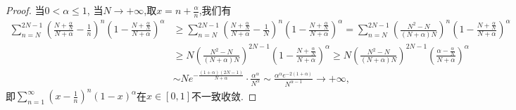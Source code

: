 \documentclass[../../main.tex]{subfiles}
\begin{document}
\begin{proof}
当$0<\alpha\leqslant1$, 当$N\to+\infty$,取$x=n+\frac{\alpha}{n}$,我们有
$$
\begin{aligned}
\sum_{n=N}^{2N-1}{\left( \frac{N+\frac{\alpha}{N}}{N+\alpha}-\frac{1}{n} \right) ^n\left( 1-\frac{N+\frac{\alpha}{N}}{N+\alpha} \right) ^{\alpha}}&\geqslant \sum_{n=N}^{2N-1}{\left( \frac{N+\frac{\alpha}{N}}{N+\alpha}-\frac{1}{N} \right) ^n\left( 1-\frac{N+\frac{\alpha}{N}}{N+\alpha} \right) ^{\alpha}}
=\sum_{n=N}^{2N-1}{\left( \frac{N^2-N}{(N+\alpha )N} \right) ^n\left( 1-\frac{N+\frac{\alpha}{N}}{N+\alpha} \right) ^{\alpha}}
\\
&\geqslant N\left( \frac{N^2-N}{(N+\alpha )N} \right) ^{2N-1}\left( 1-\frac{N+\frac{\alpha}{N}}{N+\alpha} \right) ^{\alpha}
\geqslant N\left( \frac{N^2-N}{(N+\alpha )N} \right) ^{2N-1}\left( \frac{\alpha -\frac{\alpha}{N}}{N+\alpha} \right) ^{\alpha}
\\
&\sim Ne^{-\frac{\left( 1+\alpha \right) \left( 2N-1 \right)}{N+\alpha}}\cdot \frac{\alpha ^{\alpha}}{N^{\alpha}}\sim \frac{\alpha ^{\alpha}e^{-2\left( 1+\alpha \right)}}{N^{\alpha -1}}\rightarrow +\infty ,
\end{aligned}
$$
即$\sum\limits_{n=1}^{\infty}\left(x-\frac{1}{n}\right)^n(1-x)^\alpha$在$x\in[0,1]$不一致收敛.

\end{proof}
\end{document}
